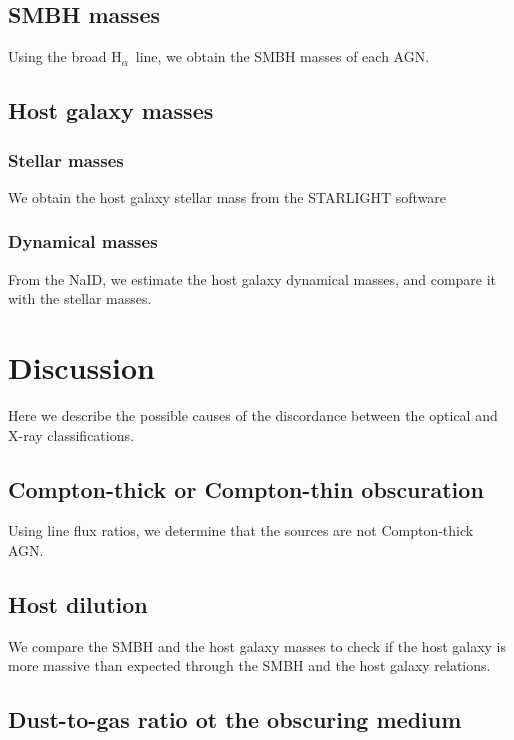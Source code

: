 \subsection{SMBH masses}
\label{sec4:bhmass}

Using the broad H$_{\alpha}$~line, we obtain the SMBH masses of each AGN.


\subsection{Host galaxy masses}
\label{sec4:galmas}

\subsubsection{Stellar masses}
\label{sec4:stmass}
We obtain the host galaxy stellar mass from the STARLIGHT software

\subsubsection{Dynamical masses}
\label{sec4:dynmas}
From the NaID, we estimate the host galaxy dynamical masses, and compare it with the stellar masses.



\section{Discussion}
\label{sec4:disc}
Here we describe the possible causes of the discordance between the optical and X-ray classifications.

\subsection{Compton-thick or Compton-thin obscuration}
\label{sec4:compton}

Using line flux ratios, we determine that the sources are not Compton-thick AGN.


\subsection{Host dilution}
\label{sec4:dil}

We compare the SMBH and the host galaxy masses to check if the host galaxy is more massive than expected through the SMBH and the host galaxy relations.

\subsection{Dust-to-gas ratio ot the obscuring medium}
\label{sec4:avnh}

